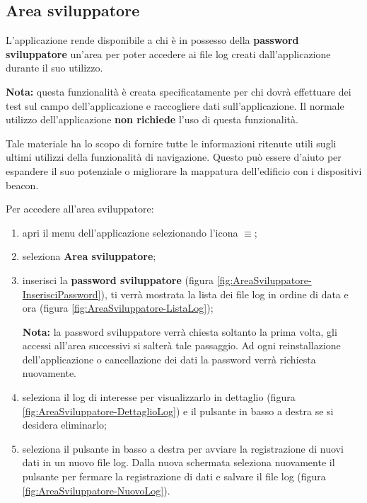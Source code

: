 \documentclass[../ClipsManualeUtente.tex]{subfiles}
\begin{document}
		
		
	\newpage
	\subsection{Area sviluppatore}
		L'applicazione rende disponibile a chi è in possesso della \textbf{password sviluppatore} un'area per poter accedere ai file log creati dall'applicazione durante il suo utilizzo.
		
		\begin{framed}
			\textbf{Nota:} questa funzionalità è creata specificatamente per chi dovrà effettuare dei test sul campo dell'applicazione e raccogliere dati sull'applicazione. Il normale utilizzo dell'applicazione \textbf{non richiede} l'uso di questa funzionalità.
		\end{framed}
		
		Tale materiale ha lo scopo di fornire tutte le informazioni ritenute utili sugli ultimi utilizzi della  funzionalità di navigazione. Questo può essere d'aiuto per espandere il suo potenziale o migliorare la mappatura dell'edificio con i dispositivi \gls{beacon}.
		
		Per accedere all'area sviluppatore:
		\begin{enumerate}
			\item apri il menu dell'applicazione selezionando l'icona $\equiv$;
			\item seleziona \textbf{Area sviluppatore}; %
			\item inserisci la \textbf{password sviluppatore} (figura \ref{fig:AreaSviluppatore-InserisciPassword}), ti verrà mostrata la lista dei file log in ordine di data e ora (figura \ref{fig:AreaSviluppatore-ListaLog});
			
		\begin{framed}
			\textbf{Nota:} la password sviluppatore verrà chiesta soltanto la prima volta, gli accessi all'area successivi si salterà tale passaggio. Ad ogni reinstallazione dell'applicazione o cancellazione dei dati la password verrà richiesta nuovamente.
		\end{framed}
					
			\item seleziona il log di interesse per visualizzarlo in dettaglio (figura \ref{fig:AreaSviluppatore-DettaglioLog}) e il pulsante in basso a destra se si desidera eliminarlo;
			
			\item seleziona il pulsante in basso a destra per avviare la registrazione di nuovi dati in un nuovo file log. Dalla nuova schermata seleziona nuovamente il pulsante per fermare la registrazione di dati e salvare il file log (figura \ref{fig:AreaSviluppatore-NuovoLog}).
		\end{enumerate}
		
\end{document}
